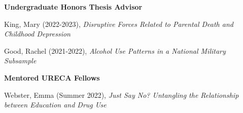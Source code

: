 \begin{comment}
\item Lacey, Conor (Oct 2022), \textit{Effect Sizes for Measurement Non-Invariance: A Review}.  Wake Forest%
\item Hwang, Yoo Ri$\dagger$ (Oct 2021), \textit{The SES-health Gradient: Comparing Two Approaches}. Wake Forest%
\item Yi, Ye Dam (Oct 2020), \textit{Feeling for Another: The Role of Emotions on Self-Other Differences in Risk-Involving Decisions}. Wake Forest%
\item Slipetz, Lindley (Sep 2020), \textit{The Structure of Depression Symptomatology: A Comparison of Factor and Network Analyses}. Wake Forest%
\item Demaske, Alana (Oct 2019), \textit{Examining the construct validity and functional utility of personal growth initiative in a war-affected Sri Lankan sample}. Wake Forest%
\end{etaremune}%
\end{comment}
{\large\textbf{Undergraduate Honors Thesis Advisor}}
\begin{etaremune}%
\item King, Mary (2022-2023), \textit{Disruptive Forces Related to Parental Death and Childhood Depression} %
\item Good, Rachel (2021-2022), \textit{Alcohol Use Patterns in a National Military Subsample} %
\end{etaremune}%

\begin{comment}
{\large\textbf{Undergraduate Honors Thesis Committee Member}}
\begin{etaremune}
\item Qian, Tom (Apr 2016), \textit{Appraisal Structure Universality}. Vanderbilt%
%
\item Sparks, Sloane (Apr 2014), \textit{Gender Differences in Emotional Intelligence: Positive Emotions \& Appraisal Theory}. Vanderbilt%
\item Fuller, Lydia (Apr 2014), \textit{GED Student Achievement Trajectories and Predictors: Using the Latent Class Growth Model to Understand Heterogeneous Learning Patterns}. Vanderbilt%
\end{etaremune}
\end{comment}

{\large\textbf{Mentored URECA Fellows}}
\begin{etaremune}%
\item Webster, Emma (Summer 2022), \textit{Just Say No? Untangling the Relationship between Education and Drug Use}%
\end{etaremune}%
